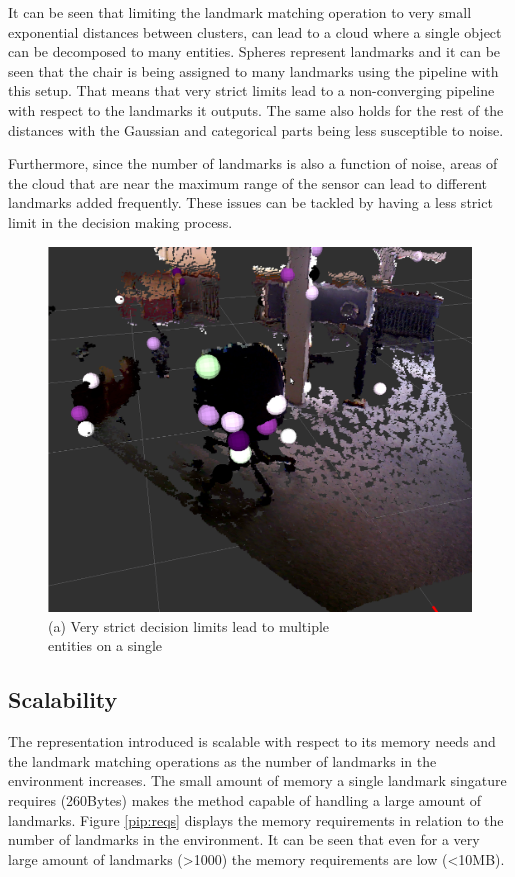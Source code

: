 \documentclass [twoside,hidelinks]{article}
\begin{document}
It can be seen that limiting the landmark matching operation to very small exponential distances between clusters, can lead to a cloud where a single object can be decomposed to many entities. Spheres represent landmarks and it can be seen that the chair is being assigned to many landmarks using the pipeline with this setup. That means that very strict limits lead to a non-converging pipeline with respect to the landmarks it outputs. The same also holds for the rest of the distances with the Gaussian and categorical parts being less susceptible to noise. 

Furthermore, since the number of landmarks is also a function of noise, areas of the cloud that are near the maximum range of the sensor can lead to different landmarks added frequently. These issues can be tackled by having a less strict limit in the decision making process.

\begin{figure} [!ht]
        \centering
	    \includegraphics [width=.5\textwidth]{monsterchair} \\
	   (a) Very strict decision limits lead to multiple \\
	   entities on a single \\ [6pt]
	  \label{pip:expo}
\end{figure}

\subsection{Scalability}

The representation introduced is scalable with respect to its memory needs and the landmark matching operations as the number of landmarks in the environment increases.
The small amount of memory a single landmark singature requires (260Bytes) makes the method capable of handling a large amount of landmarks. Figure \ref{pip:reqs} displays the memory requirements in relation to the number of landmarks in the environment. It can be seen that even for a very large amount of landmarks (>1000) the memory requirements are low (<10MB).
\end{document}
